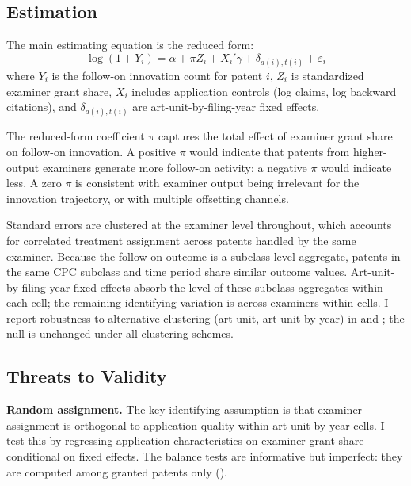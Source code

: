 \documentclass[12pt]{article}
\begin{document}
\subsection{Estimation}

The main estimating equation is the reduced form:
\begin{equation}
\log(1 + Y_{i}) = \alpha + \pi Z_{i} + X_{i}'\gamma + \delta_{a(i),t(i)} + \varepsilon_{i}
\label{eq:reducedform}
\end{equation}
where $Y_{i}$ is the follow-on innovation count for patent $i$, $Z_{i}$ is standardized examiner grant share, $X_{i}$ includes application controls (log claims, log backward citations), and $\delta_{a(i),t(i)}$ are art-unit-by-filing-year fixed effects.

The reduced-form coefficient $\pi$ captures the total effect of examiner grant share on follow-on innovation. A positive $\pi$ would indicate that patents from higher-output examiners generate more follow-on activity; a negative $\pi$ would indicate less. A zero $\pi$ is consistent with examiner output being irrelevant for the innovation trajectory, or with multiple offsetting channels.

Standard errors are clustered at the examiner level throughout, which accounts for correlated treatment assignment across patents handled by the same examiner. Because the follow-on outcome is a subclass-level aggregate, patents in the same CPC subclass and time period share similar outcome values. Art-unit-by-filing-year fixed effects absorb the level of these subclass aggregates within each cell; the remaining identifying variation is across examiners within cells. I report robustness to alternative clustering (art unit, art-unit-by-year) in  and ; the null is unchanged under all clustering schemes.

\subsection{Threats to Validity}

\textbf{Random assignment.} The key identifying assumption is that examiner assignment is orthogonal to application quality within art-unit-by-year cells. I test this by regressing application characteristics on examiner grant share conditional on fixed effects. The balance tests are informative but imperfect: they are computed among granted patents only ().
\end{document}

